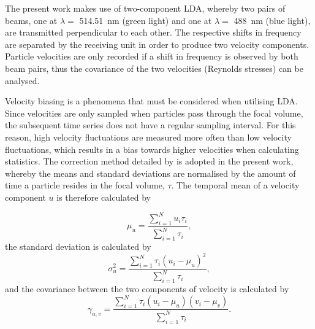 \documentclass[12pt,oneside,a4paper]{article}
\begin{document}
The present work makes use of two-component LDA, whereby two pairs of beams, one at $\lambda = $ \SI{514.51}{nm} (green light) and one at $\lambda = $ \SI{488}{nm} (blue light), are transmitted perpendicular to each other. The respective shifts in frequency are separated by the receiving unit in order to produce two velocity components. Particle velocities are only recorded if a shift in frequency is observed by both beam pairs, thus the covariance of the two velocities (Reynolds stresses) can be analysed. 

Velocity biasing is a phenomena that must be considered when utilising LDA. Since velocities are only sampled when particles pass through the focal volume, the subsequent time series does not have a regular sampling interval. For this reason, high velocity fluctuations are measured more often than low velocity fluctuations, which results in a bias towards higher velocities when calculating statistics. The correction method detailed by \cite{zhang2010lda} is adopted in the present work, whereby the means and standard deviations are normalised by the amount of time a particle resides in the focal volume, $\tau$. The temporal mean of a velocity component $u$ is therefore calculated by

\begin{equation}
\mu_u = \frac{\sum^N_{i=1} u_i \tau_i}{\sum^N_{i=1} \tau_i}, 
\end{equation}
the standard deviation is calculated by
\begin{equation}
\sigma_u^2 = \frac{\sum^N_{i=1} \tau_i (u_i - \mu_u)^2}{\sum^N_{i=1} \tau_i},
\end{equation}
and the covariance between the two components of velocity is calculated by
\begin{equation}
\gamma_{u,v} = \frac{\sum^N_{i=1} \tau_i (u_i - \mu_u)(v_i - \mu_v)}{\sum^N_{i=1} \tau_i}.
\end{equation}
\end{document}
